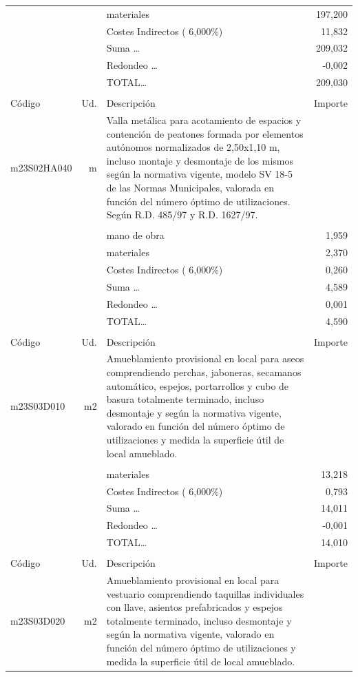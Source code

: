 \begin{supertabular}{l r p{60mm} r}
&&materiales&   197,200\\%
&&Costes Indirectos (     6,000\%)&    11,832\\%
&&Suma \ldots&   209,032\\%
&&Redondeo \ldots&    {-}0,002\\%
%
&&TOTAL\ldots&   209,030\\%
&&&\\%
Código&Ud.&Descripción&Importe\\%
\hline%
m23S02HA040&m&Valla metálica para acotamiento de espacios y contención de peatones formada por elementos autónomos normalizados de 2,50x1,10 m, incluso montaje y desmontaje de los mismos según la normativa vigente, modelo SV 18{-}5 de las Normas Municipales, valorada en función del número óptimo de utilizaciones. Según R.D. 485/97 y R.D. 1627/97.&\\%
&&&\\%
&&mano de obra&     1,959\\%
&&materiales&     2,370\\%
&&Costes Indirectos (     6,000\%)&     0,260\\%
&&Suma \ldots&     4,589\\%
&&Redondeo \ldots&     0,001\\%
%
&&TOTAL\ldots&     4,590\\%
&&&\\%
Código&Ud.&Descripción&Importe\\%
\hline%
m23S03D010&m2&Amueblamiento provisional en local para aseos comprendiendo perchas, jaboneras, secamanos automático, espejos, portarrollos y cubo de basura totalmente terminado, incluso desmontaje y según la normativa vigente, valorado en función del número óptimo de utilizaciones y medida la superficie útil de local amueblado.&\\%
&&&\\%
&&materiales&    13,218\\%
&&Costes Indirectos (     6,000\%)&     0,793\\%
&&Suma \ldots&    14,011\\%
&&Redondeo \ldots&    {-}0,001\\%
%
&&TOTAL\ldots&    14,010\\%
&&&\\%
Código&Ud.&Descripción&Importe\\%
\hline%
m23S03D020&m2&Amueblamiento provisional en local para vestuario comprendiendo taquillas individuales con llave, asientos prefabricados y espejos totalmente terminado, incluso desmontaje y según la normativa vigente, valorado en función del número óptimo de utilizaciones y medida la superficie útil de local amueblado.&\\%

\end{supertabular}
